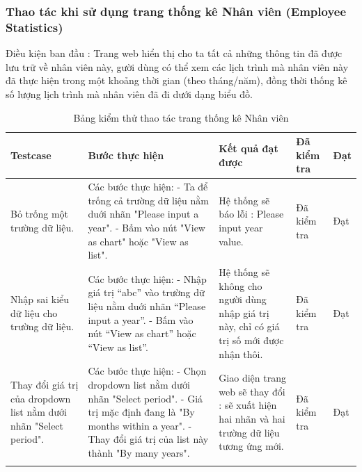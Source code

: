 \documentclass{article}
\begin{document}
\subsubsection{Thao tác khi sử dụng trang thống kê Nhân viên (Employee Statistics) }
Điều kiện ban đầu : Trang web hiển thị cho ta tất cả những thông tin đã được lưu trữ về nhân viên này, gười dùng có thể xem các lịch trình mà nhân viên này đã thực hiện trong một khoảng thời gian (theo tháng/năm), đồng thời thống kê số lượng lịch trình mà nhân viên đã đi dưới dạng biểu đồ. \newline
\begin{longtable}{ | p{} |p{} | p{}  | p{}  | p{}  | } 
\hline
\textbf{Testcase}& \textbf{Bước thực hiện}& \textbf{Kết quả đạt được} & \textbf{Đã kiểm tra}& \textbf{Đạt} \\ 
\hline
\hline
Bỏ trống một trường dữ liệu. &
Các bước thực hiện: \newline
- Ta để trống cả trường dữ liệu nằm duới nhãn "Please input a year". \newline
- Bấm vào nút "View as chart" hoặc "View as list".
&
Hệ thống sẽ báo lỗi : Please input year value.
 &
Đã kiểm tra &
Đạt \\

\hline
Nhập sai kiểu dữ liệu cho trường dữ liệu. &
Các bước thực hiện: \newline
- Nhập giá trị “abc” vào trường dữ liệu nằm duới nhãn “Please input a year”. \newline
- Bấm vào nút “View as chart” hoặc “View as list”.
&
Hệ thống sẽ không cho người dùng nhập giá trị này, chỉ có giá trị số mới được nhận thôi.
 &
Đã kiểm tra &
Đạt \\

\hline
Thay đổi giá trị của dropdown list nằm dưới nhãn "Select period". &
Các bước thực hiện: \newline
- Chọn dropdown list nằm dưới nhãn "Select period". \newline
- Giá trị mặc định đang là "By months within a year". \newline
- Thay đổi giá trị của list này thành "By many years".
&
Giao diện trang web sẽ thay đổi : sẽ xuất hiện hai nhãn và hai trường dữ liệu tương ứng mới.
 &
Đã kiểm tra &
Đạt \\

\hline
\caption{Bảng kiểm thử thao tác trang thống kê Nhân viên}
\end{longtable}
\end{document}
